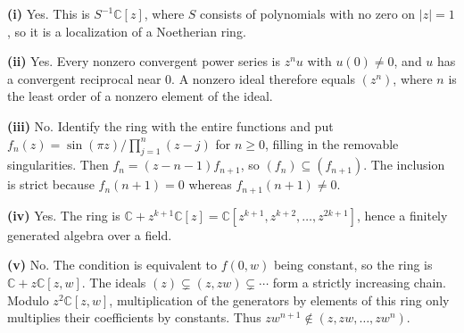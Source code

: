 \textbf{(i)} Yes. This is $S^{-1}\mathbb{C}[z]$, where $S$ consists of polynomials with no zero on $|z|=1$, so it is a localization of a Noetherian ring.

\textbf{(ii)} Yes. Every nonzero convergent power series is $z^nu$ with $u(0)\ne0$, and $u$ has a convergent reciprocal near $0$. A nonzero ideal therefore equals $(z^n)$, where $n$ is the least order of a nonzero element of the ideal.

\textbf{(iii)} No. Identify the ring with the entire functions and put $f_n(z)=\sin(\pi z)/\prod_{j=1}^n(z-j)$ for $n\ge0$, filling in the removable singularities. Then $f_n=(z-n-1)f_{n+1}$, so $(f_n)\subseteq(f_{n+1})$. The inclusion is strict because $f_n(n+1)=0$ whereas $f_{n+1}(n+1)\ne0$.

\textbf{(iv)} Yes. The ring is $\mathbb{C}+z^{k+1}\mathbb{C}[z]=\mathbb{C}[z^{k+1},z^{k+2},\ldots,z^{2k+1}]$, hence a finitely generated algebra over a field.

\textbf{(v)} No. The condition is equivalent to $f(0,w)$ being constant, so the ring is $\mathbb{C}+z\mathbb{C}[z,w]$. The ideals $(z)\subsetneq(z,zw)\subsetneq\cdots$ form a strictly increasing chain. Modulo $z^2\mathbb{C}[z,w]$, multiplication of the generators by elements of this ring only multiplies their coefficients by constants. Thus $zw^{n+1}\notin(z,zw,\ldots,zw^n)$.
